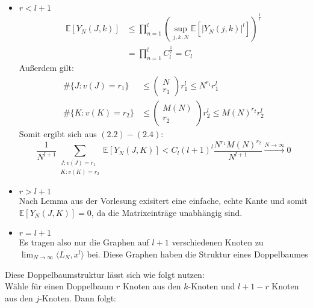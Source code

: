 \documentclass[a4paper, 11pt]{scrreprt}
\newcommand{\EE}{\mathbb{E}}
\begin{document}
\begin{itemize}
	\item \(r < l+ 1\)\\
		\begin{equation}
			\begin{split}
			\EE[Y_N(J,k)] &\leq \prod_{n=1}^l \left(\sup_{j,k,N}\EE\left[|Y_N(j,k)|^l\right]\right)^{\frac 1 l} \\
			& = \prod_{n=1}^l C_l^{\frac 1 l} = C_l
			\end{split}
			\end{equation}
	Außerdem gilt: 
		\begin{align}
			\#\{J: v(J)=r_1\} &\leq \begin{pmatrix} N \\ r_1 \end{pmatrix} r_1^l \leq N^{r_1}r_1^l \\
			\#\{K: v(K)=r_2\} &\leq \begin{pmatrix} M(N) \\ r_2 \end{pmatrix} r_2^l \leq M(N)^{r_2}r_2^l
		\end{align}
	Somit ergibt sich aus \((2.2) - (2.4)\): 
	\begin{equation}
		\frac {1}{N^{l+1}} \sum_{\substack{J:v(J)=r_1\\ K:v(K)=r_2 }} \EE[Y_N(J,K)] < C_l (l+1)^l \frac{N^{r_1} M(N)^{r_2}}{N^{l+1}} \xrightarrow{N\to\infty} 0
	\end{equation}
		
	\item \(r> l+1\) \\
		Nach Lemma aus der Vorlesung exisitert eine einfache, echte Kante und somit \(\EE[Y_N(J,K)]=0\), da die Matrixeinträge unabhängig sind.
	\item \(r=l+1\)\\
		Es tragen also nur die Graphen auf \(l+1\) verschiedenen Knoten zu \(\lim_{N\to\infty} \langle \overline{L_N}, x^l \rangle \) bei. Diese Graphen haben die Struktur eines Doppelbaumes%
\end{itemize}
Diese Doppelbaumstruktur lässt sich wie folgt nutzen:\\
Wähle für einen Doppelbaum \(r\) Knoten aus den \(k\)-Knoten und \(l+1-r\) Knoten aus den \(j\)-Knoten. Dann folgt:
\end{document}
